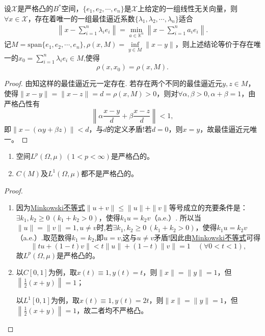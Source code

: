\documentclass[../../main.tex]{subfiles}%
\begin{document}
\begin{theorem}
设$\mathscr{X}$是严格凸的$B^*$空间，$\{e_1,e_2,\cdots,e_n\}$是$\mathscr{X}$上给定的一组线性无关向量，则$\forall x \in \mathscr{X}$，存在着唯一的一组最佳逼近系数$\{\lambda_1,\lambda_2,\cdots,\lambda_n\}$适合
\begin{align*}
\left\| x - \sum\limits_{i=1}^n \lambda_i e_i \right\| = \min\limits_{a \in \mathbb{K}^n} \left\| x - \sum\limits_{i=1}^n a_i e_i \right\|.
\end{align*}
记$M = \text{span}\{e_1,e_2,\cdots,e_n\}, \rho(x,M) = \inf\limits_{y \in M} \|x-y\|$，则上述结论等价于存在唯一的$x_0 = \sum\limits_{i=1}^n \lambda_i e_i\in M$,使得
$$\rho(x,x_0) = \rho(x,M).$$
\end{theorem}
\begin{proof}
由知这样的最佳逼近元一定存在.
若存在两个不同的最佳逼近元$y,z \in M$，使得$\|x-y\| = \|x-z\| = d = \rho(x,M)>0$，则对$\forall \alpha,\beta>0, \alpha+\beta=1$，由严格凸性有
$$\left\| \alpha \frac{x-y}{d} + \beta \frac{x-z}{d} \right\| < 1,$$
即$\|x - (\alpha y + \beta z)\| < d$，与$d$的定义矛盾!若$d=0$，则$x=y$，故最佳逼近元唯一。
\end{proof}

\begin{proposition}
\begin{enumerate}[(1)]
\item 空间$L^p(\Omega,\mu) \ (1 < p < \infty)$是严格凸的。

\item $C(M)$及$L^1(\Omega,\mu)$都不是严格凸的。
\end{enumerate}
\end{proposition}
\begin{proof}
\begin{enumerate}[(1)]
\item 因为\hyperref[Real Analysis-theorem:实变函数--Minkowski不等式]{Minkowski不等式}$\|u+v\| \leqslant \|u\| + \|v\|$等号成立的充要条件是：$\exists k_1,k_2 \geqslant 0 \ (k_1+k_2>0)$，使得$k_1 u = k_2 v$（a.e.）.
所以当$\|u\|=\|v\|=1, u \neq v$时,若$\exists k_1,k_2 \geqslant 0 \ (k_1+k_2>0)$，使得$k_1 u = k_2 v$（a.e.）.取范数得$k_1=k_2$,即$u=v$,这与$u\neq v$矛盾!因此由\hyperref[Real Analysis-theorem:实变函数--Minkowski不等式]{Minkowski不等式}可得
$$\|tu + (1-t)v\| < t\|u\| + (1-t)\|v\| = 1 \quad (\forall 0 < t < 1),$$
故$L^p(\Omega,\mu)$是严格凸的。

\item 以$C[0,1]$为例，取$x(t) \equiv 1, y(t)=t$，则$\|x\|=\|y\|=1$，但$\left\| \frac{1}{2}(x+y) \right\| = 1$；

以$L^1[0,1]$为例，取$x(t) \equiv 1, y(t)=2t$，则$\|x\|=\|y\|=1$，但$\left\| \frac{1}{2}(x+y) \right\| = 1$，故二者均不严格凸。
\end{enumerate}
\end{proof}
\end{document}

